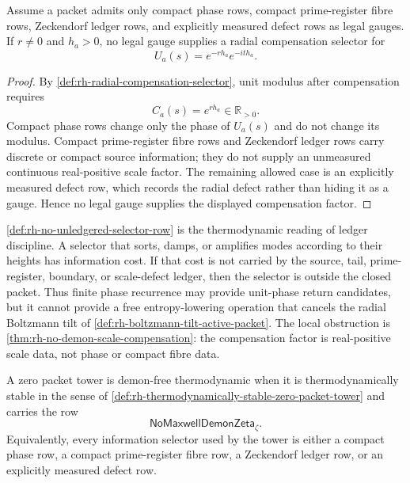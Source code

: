 \begin{theorem}
\label{thm:rh-no-demon-scale-compensation}
Assume a packet admits only compact phase rows, compact prime-register
fibre rows, Zeckendorf ledger rows, and explicitly measured defect rows
as legal gauges.  If $r\neq0$ and $h_a>0$, no legal gauge supplies a
radial compensation selector for
$$
U_a(s)=e^{-r h_a}e^{-it h_a}.
$$
\end{theorem}

\begin{proof}
By \autoref{def:rh-radial-compensation-selector}, unit modulus after
compensation requires
$$
C_a(s)=e^{r h_a}\in\mathbb R_{>0}.
$$
Compact phase rows change only the phase of $U_a(s)$ and do not change
its modulus.  Compact prime-register fibre rows and Zeckendorf ledger
rows carry discrete or compact source information; they do not supply an
unmeasured continuous real-positive scale factor.  The remaining allowed
case is an explicitly measured defect row, which records the radial
defect rather than hiding it as a gauge.  Hence no legal gauge supplies
the displayed compensation factor.
\end{proof}

\begin{principle}
\label{prin:rh-no-free-entropy-lowering}
\autoref{def:rh-no-unledgered-selector-row} is the thermodynamic reading
of ledger discipline.  A selector that sorts, damps, or amplifies modes
according to their heights has information cost.  If that cost is not
carried by the source, tail, prime-register, boundary, or scale-defect
ledger, then the selector is outside the closed packet.  Thus finite
phase recurrence may provide unit-phase return candidates, but it cannot
provide a free entropy-lowering operation that cancels the radial
Boltzmann tilt of \autoref{def:rh-boltzmann-tilt-active-packet}.  The
local obstruction is
\autoref{thm:rh-no-demon-scale-compensation}: the compensation factor is
real-positive scale data, not phase or compact fibre data.
\end{principle}

\begin{definition}
\label{def:rh-demon-free-thermodynamic-zero-tower}
A zero packet tower is demon-free thermodynamic when it is
thermodynamically stable in the sense of
\autoref{def:rh-thermodynamically-stable-zero-packet-tower} and carries
the row
$$
\mathsf{NoMaxwellDemonZeta}_{\zeta}.
$$
Equivalently, every information selector used by the tower is either a
compact phase row, a compact prime-register fibre row, a Zeckendorf
ledger row, or an explicitly measured defect row.
\end{definition}

